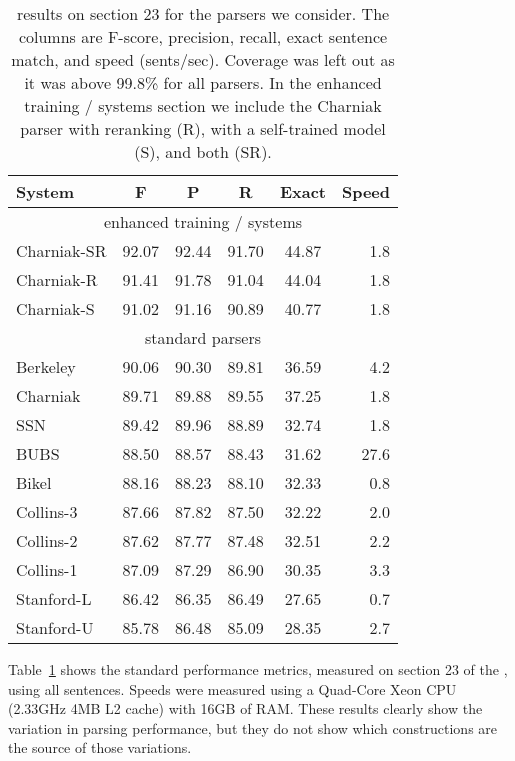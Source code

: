 \begin{table}
\begin{center}
\begin{tabular}{|lccccr|}
	\hline
		System & F & P & R & Exact & Speed \\
	\hline
	\hline
		\multicolumn{6}{|c|}{enhanced training / systems} \\
		Charniak-SR & 92.07 & 92.44 & 91.70 & 44.87 & 1.8 \\
		Charniak-R & 91.41 & 91.78 & 91.04 & 44.04 & 1.8 \\
		Charniak-S & 91.02 & 91.16 & 90.89 & 40.77 & 1.8 \\
	\hline
		\multicolumn{6}{|c|}{standard parsers} \\
		Berkeley & 90.06 & 90.30 & 89.81 & 36.59 & 4.2 \\
		Charniak & 89.71 & 89.88 & 89.55 & 37.25 & 1.8 \\
		SSN & 89.42 & 89.96 & 88.89 & 32.74 & 1.8 \\
		BUBS & 88.50 & 88.57 & 88.43 & 31.62 & 27.6 \\
		Bikel & 88.16 & 88.23 & 88.10 & 32.33 & 0.8 \\
		Collins-3 & 87.66 & 87.82 & 87.50 & 32.22 & 2.0 \\
		Collins-2 & 87.62 & 87.77 & 87.48 & 32.51 & 2.2 \\
		Collins-1 & 87.09 & 87.29 & 86.90 & 30.35 & 3.3 \\
		Stanford-L & 86.42 & 86.35 & 86.49 & 27.65 & 0.7 \\
		Stanford-U & 85.78 & 86.48 & 85.09 & 28.35 & 2.7 \\
	\hline
\end{tabular}
\caption{
	\label{tab:standard-results} \parseval results on \wsj section 23 for
	the parsers we consider.  The columns are F-score, precision, recall,
	exact sentence match, and speed (sents/sec).  Coverage was left out
	as it was above 99.8\% for all parsers.  In the {enhanced training /
	systems} section we include the Charniak parser with reranking (R), with a
	self-trained model (S), and both (SR).
}
\end{center}
\end{table}

Table~\ref{tab:standard-results} shows the standard performance metrics,
measured on section 23 of the \wsj, using all sentences.  Speeds were measured
using a Quad-Core Xeon CPU (2.33GHz 4MB L2 cache) with 16GB of RAM.
These results clearly show the variation in parsing performance, but they do
not show which constructions are the source of those variations.

